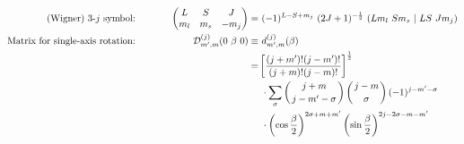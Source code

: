 \documentclass[onecolumn,preprint,superscriptaddress,nofootinbib,notitlepage,10pt,linenumbers]{revtex4-1}
\newcommand{\threej}[6]{\ensuremath{\begin{pmatrix}#1 & #2 & #3\\#4&#5&#6 \end{pmatrix}}}
\begin{document}
\begin{alignat}{2}
\text{(Wigner) 3-$j$ symbol:} &\hspace{1cm}& \threej{L}{S}{J}{m_l}{m_s}{-m_j}=&~(-1)^{L-S+m_j}~(2J+1)^{-\frac{1}{2}}~(Lm_l~Sm_s~\vert~LS~Jm_j)\\
\text{Matrix for single-axis rotation:} &\hspace{1cm}&   \mathcal{D}_{m^\prime,m}^{(j)}(0~\beta~0)\equiv&~d_{m^\prime,m}^{(j)}(\beta)\nonumber\\
&\hspace{1cm}& =&\left[\frac{(j+m^\prime)!(j-m^\prime)!}{(j+m)!(j-m)!}\right]^\frac{1}{2}\nonumber\\
&\hspace{1cm}&&~\cdot\sum_\sigma\left(j+m\atop j-m^\prime-\sigma\right)\left(j-m\atop \sigma\right)(-1)^{j-m^\prime-\sigma}\nonumber\\
&\hspace{1cm}&&~\cdot\left(\cos\frac{\beta}{2}\right)^{2\sigma+m+m^\prime}\left(\sin\frac{\beta}{2}\right)^{2j-2\sigma-m-m^\prime}
\end{alignat}


\end{document}
